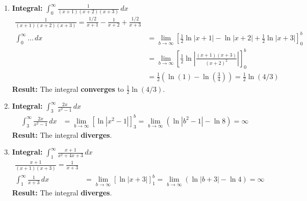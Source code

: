 \documentclass[12pt]{article}
\begin{document}
\begin{enumerate}
    \item \textbf{Integral: } $\displaystyle \int_{0}^{\infty} \frac{1}{(x+1)(x+2)(x+3)} \,dx$
    \begin{align*}
        \frac{1}{(x+1)(x+2)(x+3)} = \frac{1/2}{x+1} - \frac{1}{x+2} + \frac{1/2}{x+3} \\
        \int_{0}^{\infty} \dots \,dx &= \lim_{b \to \infty} \left[\frac{1}{2}\ln|x+1|-\ln|x+2|+\frac{1}{2}\ln|x+3|\right]_0^b \\
        &= \lim_{b \to \infty} \left[\frac{1}{2}\ln\left|\frac{(x+1)(x+3)}{(x+2)^2}\right|\right]_0^b \\
        &= \frac{1}{2} \left( \ln(1) - \ln\left(\frac{3}{4}\right) \right) = \frac{1}{2}\ln(4/3)
    \end{align*}
    \textbf{Result:} The integral \textbf{converges} to $\frac{1}{2}\ln(4/3)$.
    
    \item \textbf{Integral: } $\displaystyle \int_{3}^{\infty} \frac{2x}{x^2-1} \,dx$
    \begin{align*}
        \int_{3}^{\infty} \frac{2x}{x^2-1} \,dx &= \lim_{b \to \infty} [\ln|x^2-1|]_3^b = \lim_{b \to \infty} (\ln|b^2-1| - \ln 8) = \infty
    \end{align*}
    \textbf{Result:} The integral \textbf{diverges}.

    \item \textbf{Integral: } $\displaystyle \int_{1}^{\infty} \frac{x+1}{x^2+4x+3} \,dx$
    \begin{align*}
         \frac{x+1}{(x+1)(x+3)} = \frac{1}{x+3} \\
         \int_{1}^{\infty} \frac{1}{x+3} \,dx &= \lim_{b \to \infty} [\ln|x+3|]_{1}^{b} = \lim_{b \to \infty} (\ln|b+3| - \ln 4) = \infty
    \end{align*}
    \textbf{Result:} The integral \textbf{diverges}.

\end{enumerate}
\end{document}
